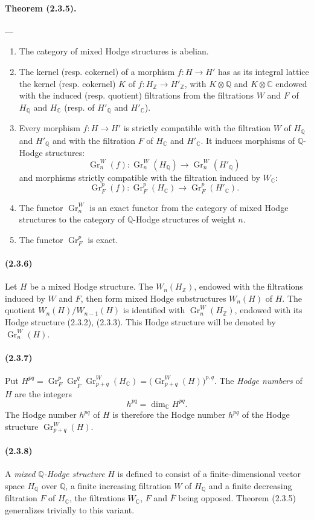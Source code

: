 \documentclass[10pt]{article}
\newcommand{\C}{\mathbb C}
\newcommand{\Q}{\mathbb Q}
\newcommand{\Z}{\mathbb Z}
\newcommand{\Gr}{\operatorname{Gr}}
\begin{document}
\paragraph{Theorem (2.3.5).} --- {\itshape
\begin{enumerate}[label=(\roman*)]
\item The category of mixed Hodge structures is abelian.
\item The kernel (resp. cokernel) of a morphism $f:H\to H'$ has as its integral lattice the kernel (resp. cokernel) $K$ of $f:H_\Z\to H'_\Z$, with $K\otimes\Q$ and $K\otimes\C$ endowed with the induced (resp. quotient) filtrations from the filtrations $W$ and $F$ of $H_\Q$ and $H_\C$ (resp. of $H'_\Q$ and $H'_\C$).
\item Every morphism $f:H\to H'$ is strictly compatible with the filtration $W$ of $H_\Q$ and $H'_\Q$ and with the filtration $F$ of $H_\C$ and $H'_\C$. It induces morphisms of $\Q$-Hodge structures:
\[
\Gr_n^W(f):\Gr_n^W(H_\Q)\longrightarrow\Gr_n^W(H'_\Q)
\]
and morphisms strictly compatible with the filtration induced by $W_\C$:
\[
\Gr_F^p(f):\Gr_F^p(H_\C)\longrightarrow\Gr_F^p(H'_\C).
\]
\item The functor $\Gr_n^W$ is an exact functor from the category of mixed Hodge structures to the category of $\Q$-Hodge structures of weight $n$.
\item The functor $\Gr_F^p$ is exact.
\end{enumerate}}

\paragraph{(2.3.6)} Let $H$ be a mixed Hodge structure. The $W_n(H_\Z)$, endowed with the filtrations induced by $W$ and $F$, then form mixed Hodge substructures $W_n(H)$ of $H$. The quotient $W_n(H)/W_{n-1}(H)$ is identified with $\Gr_n^W(H_\Z)$, endowed with its Hodge structure (2.3.2), (2.3.3). This Hodge structure will be denoted by $\Gr_n^W(H)$.

\paragraph{(2.3.7)} Put $H^{pq}=\Gr_F^p\Gr_{\overline F}^q\Gr_{p+q}^W(H_\C)=\bigl(\Gr_{p+q}^W(H)\bigr)^{p,q}$. The \emph{Hodge numbers} of $H$ are the integers
\[
h^{pq}=\dim_\C H^{pq}.
\]
The Hodge number $h^{pq}$ of $H$ is therefore the Hodge number $h^{pq}$ of the Hodge structure $\Gr_{p+q}^W(H)$.

\paragraph{(2.3.8)} A \emph{mixed $\Q$-Hodge structure} $H$ is defined to consist of a finite-dimensional vector space $H_\Q$ over $\Q$, a finite increasing filtration $W$ of $H_\Q$ and a finite decreasing filtration $F$ of $H_\C$, the filtrations $W_\C$, $F$ and $\overline F$ being opposed. Theorem (2.3.5) generalizes trivially to this variant.
\end{document}
